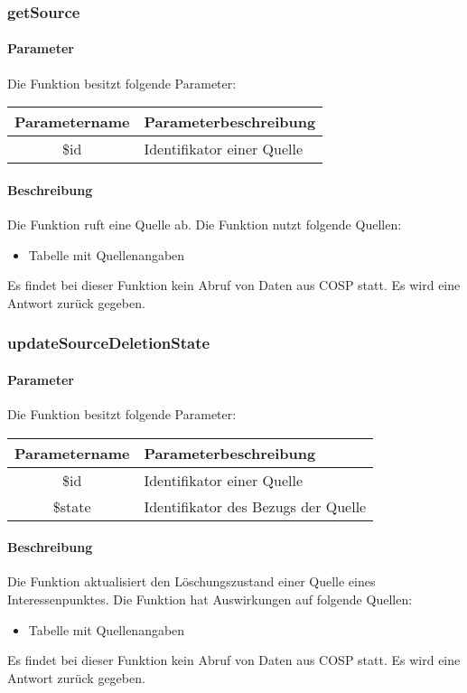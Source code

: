 \subsubsection{getSource}
\paragraph{Parameter} Die Funktion besitzt folgende Parameter:
\begin{table}[H]
	\begin{tabular}{|c|p{11cm}|}
		\hline
		\textbf{Parametername} & \textbf{Parameterbeschreibung} \\ \hline
		\$id & Identifikator einer Quelle \\ \hline
	\end{tabular}
\end{table}
\paragraph{Beschreibung} Die Funktion ruft eine Quelle ab. Die Funktion nutzt folgende Quellen:
\begin{itemize}
	\item Tabelle mit Quellenangaben
\end{itemize}
Es findet bei dieser Funktion kein Abruf von Daten aus {\glqq COSP\grqq} statt. Es wird eine Antwort zurück gegeben.
\subsubsection{updateSourceDeletionState}
\paragraph{Parameter} Die Funktion besitzt folgende Parameter:
\begin{table}[H]
	\begin{tabular}{|c|p{11cm}|}
		\hline
		\textbf{Parametername} & \textbf{Parameterbeschreibung} \\ \hline
		\$id    & Identifikator einer Quelle \\ \hline
		\$state & Identifikator des Bezugs der Quelle \\ \hline
	\end{tabular}
\end{table}
\paragraph{Beschreibung} Die Funktion aktualisiert den Löschungszustand einer Quelle eines Interessenpunktes. Die Funktion hat Auswirkungen auf folgende Quellen:
\begin{itemize}
	\item Tabelle mit Quellenangaben
\end{itemize}
Es findet bei dieser Funktion kein Abruf von Daten aus {\glqq COSP\grqq} statt. Es wird eine Antwort zurück gegeben.
